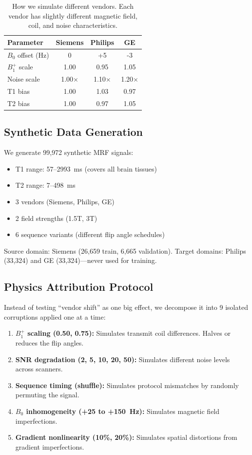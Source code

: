 \documentclass[11pt,a4paper]{article}
\begin{document}
\begin{table}[ht]
\centering
\caption{How we simulate different vendors. Each vendor has slightly
different magnetic field, coil, and noise characteristics.}
\label{tab:vendor_params}
\begin{tabular}{@{}lccc@{}}
\toprule
\textbf{Parameter} & \textbf{Siemens} & \textbf{Philips} & \textbf{GE} \\
\midrule
$B_0$ offset (Hz) & 0 & +5 & -3 \\
$B_1^+$ scale & 1.00 & 0.95 & 1.05 \\
Noise scale & 1.00$\times$ & 1.10$\times$ & 1.20$\times$ \\
T1 bias & 1.00 & 1.03 & 0.97 \\
T2 bias & 1.00 & 0.97 & 1.05 \\
\bottomrule
\end{tabular}
\end{table}

\subsection{Synthetic Data Generation}

We generate 99{,}972 synthetic MRF signals:
\begin{itemize}
  \item T1 range: 57--2993~ms (covers all brain tissues)
  \item T2 range: 7--498~ms
  \item 3 vendors (Siemens, Philips, GE)
  \item 2 field strengths (1.5T, 3T)
  \item 6 sequence variants (different flip angle schedules)
\end{itemize}

Source domain: Siemens (26{,}659 train, 6{,}665 validation).
Target domains: Philips (33{,}324) and GE (33{,}324)---never used for
training.

\subsection{Physics Attribution Protocol}

Instead of testing ``vendor shift'' as one big effect, we decompose it
into 9 isolated corruptions applied one at a time:

\begin{enumerate}
  \item \textbf{$B_1^+$ scaling (0.50, 0.75):} Simulates transmit coil
    differences. Halves or reduces the flip angles.
  \item \textbf{SNR degradation (2, 5, 10, 20, 50):} Simulates
    different noise levels across scanners.
  \item \textbf{Sequence timing (shuffle):} Simulates protocol
    mismatches by randomly permuting the signal.
  \item \textbf{$B_0$ inhomogeneity (+25 to +150~Hz):} Simulates
    magnetic field imperfections.
  \item \textbf{Gradient nonlinearity (10\%, 20\%):} Simulates
    spatial distortions from gradient imperfections.
\end{enumerate}
\end{document}
